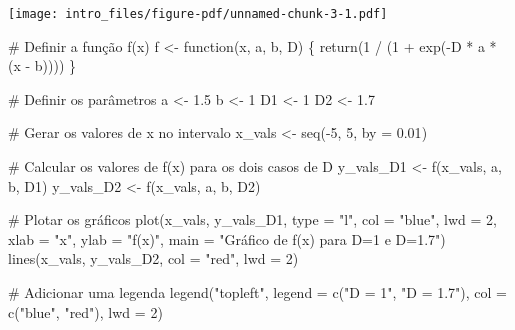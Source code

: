 \documentclass[
  letterpaper,
  DIV=11,
  numbers=noendperiod]{scrreprt}
\newenvironment{Shaded}{\begin{snugshade}}{\end{snugshade}}
\newcommand{\AttributeTok}[1]{\textcolor[rgb]{0.40,0.45,0.13}{#1}}
\newcommand{\CommentTok}[1]{\textcolor[rgb]{0.37,0.37,0.37}{#1}}
\newcommand{\ControlFlowTok}[1]{\textcolor[rgb]{0.00,0.23,0.31}{#1}}
\newcommand{\DecValTok}[1]{\textcolor[rgb]{0.68,0.00,0.00}{#1}}
\newcommand{\FloatTok}[1]{\textcolor[rgb]{0.68,0.00,0.00}{#1}}
\newcommand{\FunctionTok}[1]{\textcolor[rgb]{0.28,0.35,0.67}{#1}}
\newcommand{\NormalTok}[1]{\textcolor[rgb]{0.00,0.23,0.31}{#1}}
\newcommand{\OtherTok}[1]{\textcolor[rgb]{0.00,0.23,0.31}{#1}}
\newcommand{\SpecialCharTok}[1]{\textcolor[rgb]{0.37,0.37,0.37}{#1}}
\newcommand{\StringTok}[1]{\textcolor[rgb]{0.13,0.47,0.30}{#1}}
\begin{document}
\texttt{[image: intro\_files/figure-pdf/unnamed-chunk-3-1.pdf]}

\begin{Shaded}
\begin{Highlighting}[]
\CommentTok{\# Definir a função f(x)}
\NormalTok{f }\OtherTok{\textless{}{-}} \ControlFlowTok{function}\NormalTok{(x, a, b, D) \{}
  \FunctionTok{return}\NormalTok{(}\DecValTok{1} \SpecialCharTok{/}\NormalTok{ (}\DecValTok{1} \SpecialCharTok{+} \FunctionTok{exp}\NormalTok{(}\SpecialCharTok{{-}}\NormalTok{D }\SpecialCharTok{*}\NormalTok{ a }\SpecialCharTok{*}\NormalTok{ (x }\SpecialCharTok{{-}}\NormalTok{ b))))}
\NormalTok{\}}

\CommentTok{\# Definir os parâmetros}
\NormalTok{a }\OtherTok{\textless{}{-}} \FloatTok{1.5}
\NormalTok{b }\OtherTok{\textless{}{-}} \DecValTok{1}
\NormalTok{D1 }\OtherTok{\textless{}{-}} \DecValTok{1}
\NormalTok{D2 }\OtherTok{\textless{}{-}} \FloatTok{1.7}

\CommentTok{\# Gerar os valores de x no intervalo}
\NormalTok{x\_vals }\OtherTok{\textless{}{-}} \FunctionTok{seq}\NormalTok{(}\SpecialCharTok{{-}}\DecValTok{5}\NormalTok{, }\DecValTok{5}\NormalTok{, }\AttributeTok{by =} \FloatTok{0.01}\NormalTok{)}

\CommentTok{\# Calcular os valores de f(x) para os dois casos de D}
\NormalTok{y\_vals\_D1 }\OtherTok{\textless{}{-}} \FunctionTok{f}\NormalTok{(x\_vals, a, b, D1)}
\NormalTok{y\_vals\_D2 }\OtherTok{\textless{}{-}} \FunctionTok{f}\NormalTok{(x\_vals, a, b, D2)}

\CommentTok{\# Plotar os gráficos}
\FunctionTok{plot}\NormalTok{(x\_vals, y\_vals\_D1, }\AttributeTok{type =} \StringTok{"l"}\NormalTok{, }\AttributeTok{col =} \StringTok{"blue"}\NormalTok{, }\AttributeTok{lwd =} \DecValTok{2}\NormalTok{, }
     \AttributeTok{xlab =} \StringTok{"x"}\NormalTok{, }\AttributeTok{ylab =} \StringTok{"f(x)"}\NormalTok{, }\AttributeTok{main =} \StringTok{"Gráfico de f(x) para D=1 e D=1.7"}\NormalTok{)}
\FunctionTok{lines}\NormalTok{(x\_vals, y\_vals\_D2, }\AttributeTok{col =} \StringTok{"red"}\NormalTok{, }\AttributeTok{lwd =} \DecValTok{2}\NormalTok{)}

\CommentTok{\# Adicionar uma legenda}
\FunctionTok{legend}\NormalTok{(}\StringTok{"topleft"}\NormalTok{, }\AttributeTok{legend =} \FunctionTok{c}\NormalTok{(}\StringTok{"D = 1"}\NormalTok{, }\StringTok{"D = 1.7"}\NormalTok{), }\AttributeTok{col =} \FunctionTok{c}\NormalTok{(}\StringTok{"blue"}\NormalTok{, }\StringTok{"red"}\NormalTok{), }\AttributeTok{lwd =} \DecValTok{2}\NormalTok{)}
\end{Highlighting}
\end{Shaded}
\end{document}
